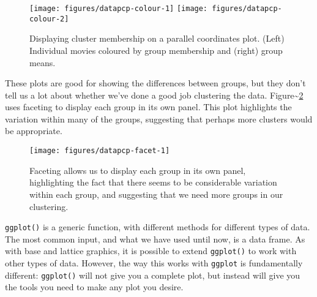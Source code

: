\begin{figure}
\texttt{[image: figures/datapcp-colour-1]} \texttt{[image: figures/datapcp-colour-2]} \caption{Displaying cluster membership on a parallel coordinates plot. (Left) Individual movies coloured by group membership and (right) group means.\label{fig:pcp-colour}}
\end{figure}

These plots are good for showing the differences between groups, but
they don't tell us a lot about whether we've done a good job clustering
the data. Figure\textasciitilde{}\ref{fig:pcp-facet} uses faceting to
display each group in its own panel. This plot highlights the variation
within many of the groups, suggesting that perhaps more clusters would
be appropriate.

\begin{Shaded}
\begin{Highlighting}[]
\StringTok{ }\NormalTok{(}  \NormalTok{/}\NormalTok{) +}
\StringTok{  }\NormalTok{(~}\StringTok{ }
\end{Highlighting}
\end{Shaded}

\begin{figure}
\texttt{[image: figures/datapcp-facet-1]} \caption{Faceting allows us to display each group in its own panel, highlighting the fact that there seems to be considerable variation within each group, and suggesting that we need more groups in our clustering.\label{fig:pcp-facet}}
\end{figure}


\texttt{ggplot()} is a generic function, with different methods for
different types of data. The most common input, and what we have used
until now, is a data frame. As with base and lattice graphics, it is
possible to extend \texttt{ggplot()} to work with other types of data.
However, the way this works with \texttt{ggplot} is fundamentally
different: \texttt{ggplot()} will not give you a complete plot, but
instead will give you the tools you need to make any plot you desire.

